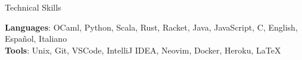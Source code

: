 
\begin{rSection}{Technical Skills}

	\textbf{Languages}: OCaml, Python, Scala, Rust, Racket, Java, JavaScript, C, English, Espa{\~n}ol, Italiano
	\\
	\textbf{Tools}: Unix, Git, VSCode, IntelliJ IDEA, Neovim, Docker, Heroku, \LaTeX
\end{rSection}